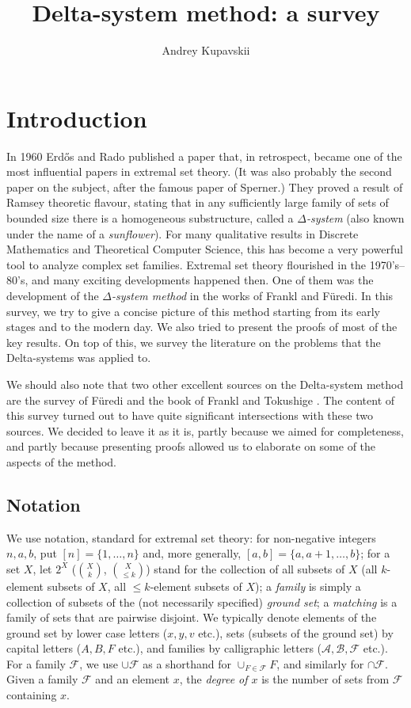 \documentclass[graybox]{svmult}
\title{Delta-system method: a survey}
\author{Andrey Kupavskii}
\institute{Andrey Kupavskii\at Moscow Institute of Physics and Technology, St. Petersburg State University, Innopolis University, Russia \email{kupavskii@ya.ru}}
\date{}
\renewcommand{\le}{\leqslant}
\newcommand{\ff}{\mathcal{F}}
\newcommand{\m}{\mathcal}
\begin{document}
\maketitle


\section{Introduction}
In 1960 Erd\H os and Rado \cite{ER} published a paper that, in retrospect, became one of the most influential papers in extremal set theory. (It was also probably the second paper on the subject, after the famous paper of Sperner.) They proved a result of Ramsey theoretic flavour, stating that in any sufficiently large family of sets of bounded size there is a homogeneous substructure, called a {\it $\Delta$-system} (also known under the name of a {\it sunflower}). For many qualitative results in Discrete Mathematics and Theoretical Computer Science, this has become a very powerful tool to analyze complex set families. Extremal set theory flourished in the 1970's--80's, and many exciting developments happened then. One of them was the development of the  {\em $\Delta$-system method} in the works of Frankl and F\"uredi. In this survey, we try to give a concise picture of this method starting from its early stages and to the modern day. We also tried to present the proofs of most of the key results. On top of this, we survey the literature on the problems that the Delta-systems was applied to. 

We should also note that two other excellent sources on the Delta-system method are the survey of F\"uredi \cite{Fur91} and the book of Frankl and Tokushige \cite{FT}. The content of this survey turned out to have quite significant intersections with these two sources. We decided to leave it as it is, partly because we aimed for completeness, and partly because presenting proofs allowed us to elaborate on some of the aspects of the method.
\tableofcontents


\subsection{Notation} We use notation, standard for extremal set theory: for non-negative integers $n,a,b$, put  $[n]=\{1,\ldots, n\}$ and, more generally, $[a,b]=\{a,a+1,\ldots, b\}$; for a set $X$, let $2^{X}$ (${X\choose k}$, ${X\choose \le k}$) stand for  the collection of all subsets of $X$ (all $k$-element subsets of $X$, all $\le k$-element subsets of $X$); a {\it family} is simply a collection of subsets of the (not necessarily specified) {\it ground set}; a {\it matching} is a family of sets that are pairwise disjoint. We typically denote elements of the ground set by lower case letters ($x,y,v$ etc.), sets (subsets of the ground set) by capital letters ($A,B,F$ etc.), and families by calligraphic letters ($\mathcal A, \m B, \ff$ etc.). For a family $\ff$, we use $\cup \ff$ as a shorthand for $\cup_{F\in\ff}F$, and similarly for $\cap \ff$. Given a family $\ff$ and an element $x$, the {\it degree of $x$} is the number of sets from $\ff$ containing $x$.
\end{document}
